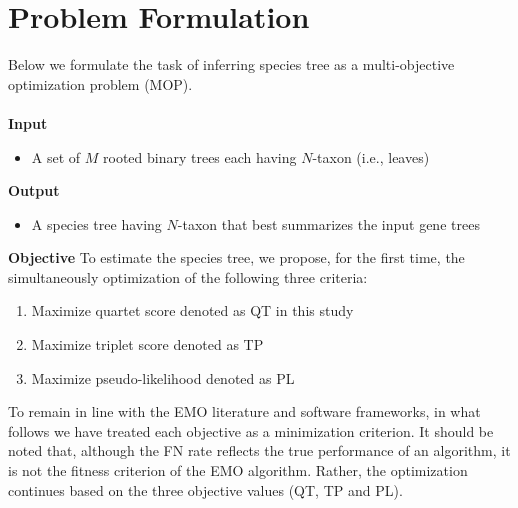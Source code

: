 \section{Problem Formulation}
\label{sec:problem}
Below we formulate the task of inferring species tree as a multi-objective optimization problem (MOP).\\\\
\textbf{Input}
\begin{itemize}
	\item A set of $M$ rooted binary trees each having $N$-taxon (i.e., leaves)
\end{itemize}
\textbf{Output}
\begin{itemize}
	\item A species tree having $N$-taxon that best summarizes the input gene trees
\end{itemize}
\textbf{Objective} To estimate the species tree, we propose, for the first time, the simultaneously optimization of the following three criteria:
\begin{enumerate}[label=$F_\arabic*$)]
	\item  Maximize quartet score denoted as QT in this study
	\item  Maximize triplet score denoted as TP 
	\item  Maximize pseudo-likelihood denoted as PL    
\end{enumerate}

To remain in line with the EMO literature and software frameworks, in what follows we have treated each objective as a minimization criterion. It should be noted that, although the FN rate reflects the true performance of an algorithm, it is not the fitness criterion of the EMO algorithm. Rather, the optimization continues based on the three objective values (QT, TP and PL).

